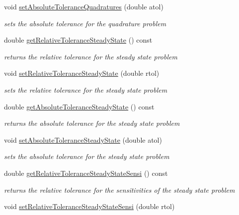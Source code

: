 \begin{DoxyCompactItemize}
void \mbox{\hyperlink{classamici_1_1_solver_af425163c5d98c472d17e080da4ee3b78}{set\+Absolute\+Tolerance\+Quadratures}} (double atol)
\begin{DoxyCompactList}\small\item\em sets the absolute tolerance for the quadrature problem \end{DoxyCompactList}\item 
double \mbox{\hyperlink{classamici_1_1_solver_ae598de1a48d3c4af1d08b8436d481e11}{get\+Relative\+Tolerance\+Steady\+State}} () const
\begin{DoxyCompactList}\small\item\em returns the relative tolerance for the steady state problem \end{DoxyCompactList}\item 
void \mbox{\hyperlink{classamici_1_1_solver_abdc290e52ae8a037aa65648f044c1ab5}{set\+Relative\+Tolerance\+Steady\+State}} (double rtol)
\begin{DoxyCompactList}\small\item\em sets the relative tolerance for the steady state problem \end{DoxyCompactList}\item 
double \mbox{\hyperlink{classamici_1_1_solver_adbb1549f9762649455bde39c29d47a03}{get\+Absolute\+Tolerance\+Steady\+State}} () const
\begin{DoxyCompactList}\small\item\em returns the absolute tolerance for the steady state problem \end{DoxyCompactList}\item 
void \mbox{\hyperlink{classamici_1_1_solver_a78e5814a90b24ff22d5ef1fbed1fc23c}{set\+Absolute\+Tolerance\+Steady\+State}} (double atol)
\begin{DoxyCompactList}\small\item\em sets the absolute tolerance for the steady state problem \end{DoxyCompactList}\item 
double \mbox{\hyperlink{classamici_1_1_solver_ac47e18a62130e7c84a8d7ceb0cb9d7eb}{get\+Relative\+Tolerance\+Steady\+State\+Sensi}} () const
\begin{DoxyCompactList}\small\item\em returns the relative tolerance for the sensitivities of the steady state problem \end{DoxyCompactList}\item 
void \mbox{\hyperlink{classamici_1_1_solver_a7a324b1a30b5246828354c60c86c3583}{set\+Relative\+Tolerance\+Steady\+State\+Sensi}} (double rtol)

\end{DoxyCompactItemize}
